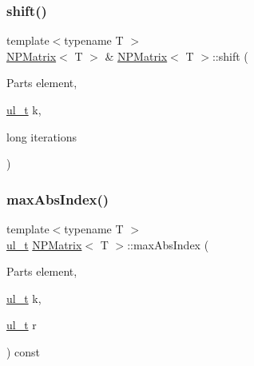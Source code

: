 \subsubsection{\texorpdfstring{shift()}{shift()}}
{\footnotesize\ttfamily template$<$typename T $>$ \\
\mbox{\hyperlink{class_n_p_matrix}{N\+P\+Matrix}}$<$ T $>$ \& \mbox{\hyperlink{class_n_p_matrix}{N\+P\+Matrix}}$<$ T $>$\+::shift (\begin{DoxyParamCaption}\item[{Parts}]{element,  }\item[{\mbox{\hyperlink{typedef_8h_a1b140a2034db3f5dfe18a987745df43a}{ul\+\_\+t}}}]{k,  }\item[{long}]{iterations }\end{DoxyParamCaption})\hspace{0.3cm}{\ttfamily [protected]}}

\mbox{\label{class_n_p_matrix_a4bff3c9956c688973307fd9c627e0ebd}} 
\subsubsection{\texorpdfstring{maxAbsIndex()}{maxAbsIndex()}}
{\footnotesize\ttfamily template$<$typename T $>$ \\
\mbox{\hyperlink{typedef_8h_a1b140a2034db3f5dfe18a987745df43a}{ul\+\_\+t}} \mbox{\hyperlink{class_n_p_matrix}{N\+P\+Matrix}}$<$ T $>$\+::max\+Abs\+Index (\begin{DoxyParamCaption}\item[{Parts}]{element,  }\item[{\mbox{\hyperlink{typedef_8h_a1b140a2034db3f5dfe18a987745df43a}{ul\+\_\+t}}}]{k,  }\item[{\mbox{\hyperlink{typedef_8h_a1b140a2034db3f5dfe18a987745df43a}{ul\+\_\+t}}}]{r }\end{DoxyParamCaption}) const\hspace{0.3cm}{\ttfamily [protected]}}

\mbox{\label{class_n_p_matrix_a332d3f82121d71e1e349aa450af39207}} 
